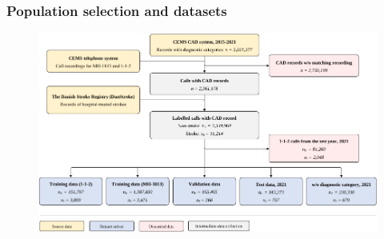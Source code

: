 \begin{frame}
    \frametitle{Population selection and datasets}
    \begin{figure}
        \centering
        \includegraphics[width=0.65\paperwidth]{../graphics/paper_retrospective/data_flowchart.pdf}
    \end{figure}
\end{frame}


